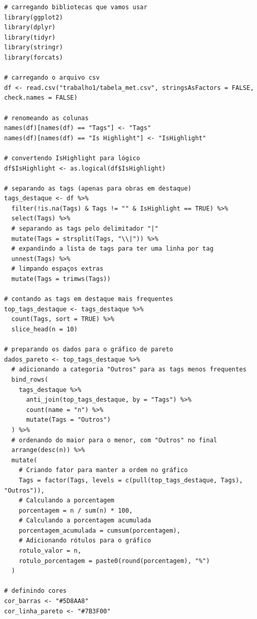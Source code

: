 \documentclass[11pt,a4paper]{article}
\begin{document}
\begin{verbatim}
# carregando bibliotecas que vamos usar
library(ggplot2)
library(dplyr)
library(tidyr)
library(stringr)
library(forcats)

# carregando o arquivo csv
df <- read.csv("trabalho1/tabela_met.csv", stringsAsFactors = FALSE, check.names = FALSE)

# renomeando as colunas
names(df)[names(df) == "Tags"] <- "Tags"
names(df)[names(df) == "Is Highlight"] <- "IsHighlight"

# convertendo IsHighlight para lógico
df$IsHighlight <- as.logical(df$IsHighlight)

# separando as tags (apenas para obras em destaque)
tags_destaque <- df %>%
  filter(!is.na(Tags) & Tags != "" & IsHighlight == TRUE) %>%
  select(Tags) %>%
  # separando as tags pelo delimitador "|"
  mutate(Tags = strsplit(Tags, "\\|")) %>%
  # expandindo a lista de tags para ter uma linha por tag
  unnest(Tags) %>%
  # limpando espaços extras
  mutate(Tags = trimws(Tags))

# contando as tags em destaque mais frequentes
top_tags_destaque <- tags_destaque %>%
  count(Tags, sort = TRUE) %>%
  slice_head(n = 10)

# preparando os dados para o gráfico de pareto
dados_pareto <- top_tags_destaque %>%
  # adicionando a categoria "Outros" para as tags menos frequentes
  bind_rows(
    tags_destaque %>%
      anti_join(top_tags_destaque, by = "Tags") %>%
      count(name = "n") %>%
      mutate(Tags = "Outros")
  ) %>%
  # ordenando do maior para o menor, com "Outros" no final
  arrange(desc(n)) %>%
  mutate(
    # Criando fator para manter a ordem no gráfico
    Tags = factor(Tags, levels = c(pull(top_tags_destaque, Tags), "Outros")),
    # Calculando a porcentagem
    porcentagem = n / sum(n) * 100,
    # Calculando a porcentagem acumulada
    porcentagem_acumulada = cumsum(porcentagem),
    # Adicionando rótulos para o gráfico
    rotulo_valor = n,
    rotulo_porcentagem = paste0(round(porcentagem), "%")
  )

# definindo cores
cor_barras <- "#5D8AA8"
cor_linha_pareto <- "#7B3F00"


\end{verbatim}
\end{document}
